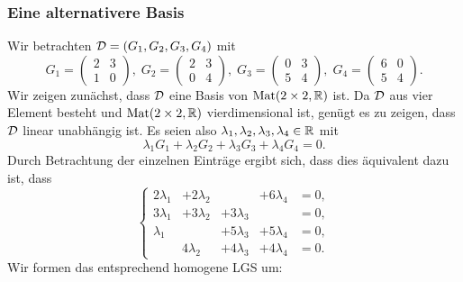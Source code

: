 \documentclass[a4paper,10pt]{article}
\begin{document}
\subsubsection{Eine alternativere Basis}
Wir betrachten $\mathcal{D} = (G_1, G_2, G_3, G_4)$ mit
\[
 G_1 = \begin{pmatrix} 2 & 3 \\ 1 & 0 \end{pmatrix}, \;
 G_2 = \begin{pmatrix} 2 & 3 \\ 0 & 4 \end{pmatrix}, \;
 G_3 = \begin{pmatrix} 0 & 3 \\ 5 & 4 \end{pmatrix}, \;
 G_4 = \begin{pmatrix} 6 & 0 \\ 5 & 4 \end{pmatrix}.
\]
Wir zeigen zunächst, dass $\mathcal{D}$ eine Basis von $\mathrm{Mat}(2 \times 2, \mathbb{R})$ ist. Da $\mathcal{D}$ aus vier Element besteht und $\mathrm{Mat}(2 \times 2, \mathbb{R})$ vierdimensional ist, genügt es zu zeigen, dass $\mathcal{D}$ linear unabhängig ist. Es seien also $\lambda_1, \lambda_2, \lambda_3, \lambda_4 \in \mathbb{R}$ mit
\[
 \lambda_1 G_1 + \lambda_2 G_2 + \lambda_3 G_3 + \lambda_4 G_4 = 0.
\]
Durch Betrachtung der einzelnen Einträge ergibt sich, dass dies äquivalent dazu ist, dass
\[
 \left\{
  \begin{matrix}
   2\lambda_1 & +2\lambda_2 &             & +6\lambda_4 & = 0, \\
   3\lambda_1 & +3\lambda_2 & +3\lambda_3 &             & = 0, \\
    \lambda_1 &             & +5\lambda_3 & +5\lambda_4 & = 0, \\
              & 4\lambda_2  & +4\lambda_3 & +4\lambda_4 & = 0.
  \end{matrix}
  \right.
\]
Wir formen das entsprechend homogene LGS um:
\end{document}
